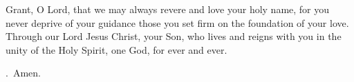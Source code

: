 \lettrine[lines=3]{G}{}rant, O Lord,
that we may always revere and love your holy name,
for you never deprive of your guidance
those you set firm on the foundation of your love.
Through our Lord Jesus Christ, your Son,
who lives and reigns with you in the unity of the Holy Spirit,
one God, for ever and ever. \par \Rbar.~Amen.
